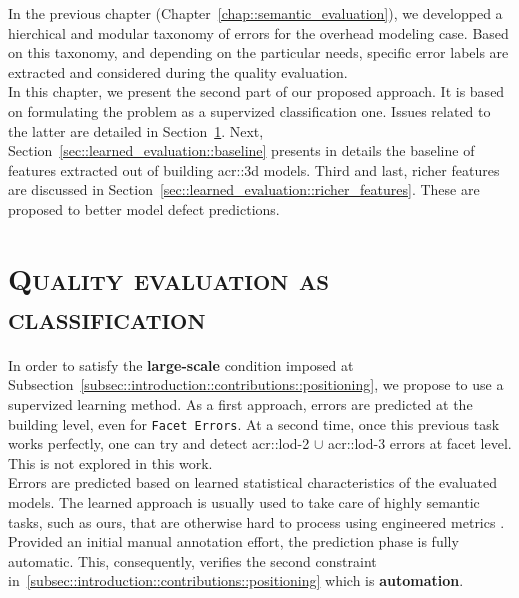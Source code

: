 \minitoc

\vfill

In the previous chapter (Chapter~\ref{chap::semantic_evaluation}), we developped a hierchical and modular taxonomy of errors for the overhead modeling case.
Based on this taxonomy, and depending on the particular needs, specific error labels are extracted and considered during the quality evaluation.\\
In this chapter, we present the second part of our proposed approach.
It is based on formulating the problem as a supervized classification one.
Issues related to the latter are detailed in Section~\ref{sec::learned_evaluation::classification}.
Next, Section~\ref{sec::learned_evaluation::baseline} presents in details the baseline of features extracted out of building \gls{acr::3d} models.
Third and last, richer features are discussed in Section~\ref{sec::learned_evaluation::richer_features}.
These are proposed to better model defect predictions.

\clearpage

\section{\textsc{Quality evaluation as classification}}
    \label{sec::learned_evaluation::classification}
    In order to satisfy the \textbf{large-scale} condition imposed at Subsection~\ref{subsec::introduction::contributions::positioning}, we propose to use a supervized learning method.
    As a first approach, errors are predicted at the building level, even for \texttt{Facet Errors}.
    At a second time, once this previous task works perfectly, one can try and detect \gls{acr::lod}-2 $\cup$ \gls{acr::lod}-3 errors at facet level.
    This is not explored in this work.\\
    Errors are predicted based on learned statistical characteristics of the evaluated models.
    The learned approach is usually used to take care of highly semantic tasks, such as ours, that are otherwise hard to process using engineered metrics \addref.\\
    Provided an initial manual annotation effort, the prediction phase is fully automatic.
    This, consequently, verifies the second constraint in~\ref{subsec::introduction::contributions::positioning} which is \textbf{automation}.\\

